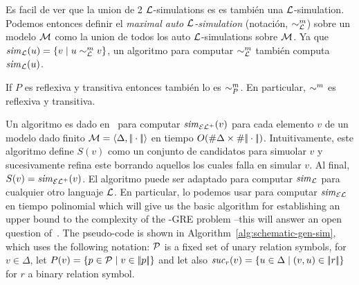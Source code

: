 \iffullversion
Es facil de ver que la union de 2 $\mathcal{L}$-simulations es
es tambi\'en una $\mathcal{L}$-simulation. Podemos entonces definir el \emph{maximal
auto $\mathcal{L}$-simulation} (notaci\'on, $\sim^m_{\mathcal{L}}$) sobre un modelo $\mathcal{M}$ como la union de todos los
auto $\mathcal{L}$-simulations sobre $\mathcal{M}$. Ya que
${\it sim}_{\mathcal{L}}(u) = \{v \mid u \sim^m_{\mathcal{L}} v\}$, un algoritmo
para computar $\sim^m_{\mathcal{L}}$ tambi\'en computa ${\it sim}_{\mathcal{L}}(u)$.
\else
\fi

\iffullversion
If $P$ es reflexiva y transitiva entonces tambi\'en lo es $\sim^m_P$. En
particular, $\sim^m$ es reflexiva y transitiva.
\else
\fi



Un algoritmo es dado en~\cite{HHK95} para computar ${\it sim}_{{\mathcal{EL}^+}}(v)$ para cada
elemento $v$ de un modelo dado finito
$\mathcal{M}=\langle \Delta,|\!|\cdot|\!| \rangle$
en tiempo $O(\# \Delta\times\# {|\!|\cdot|\!|})$.
Intuitivamente, este algoritmo
define $S(v)$ como un conjunto de candidatos para simuolar $v$ y
sucesivamente refina este borrando aquellos los cuales falla en simular $v$.
Al final, $S(v)={\it sim}_{\mathcal{EL}^+}(v)$. El algoritmo puede ser adaptado para
computar ${\it sim}_{\mathcal{L}}$ para cualquier otro languaje $\mathcal{L}$. En particular,
lo podemos usar para computar ${\it sim}_\mathcal{EL}$ en tiempo polinomial which will
give us the basic algorithm for establishing an upper bound to the
complexity of the \EL-GRE problem --this will answer an open
question of~\cite{AKS08}. The pseudo-code is shown in
Algorithm~\ref{alg:schematic-gen-sim}, which uses the following
notation: $\mathcal{P}$ is a fixed set of unary relation symbols,  for $v\in
\Delta$, let $P(v)=\{p\in\mathcal{P}\mid v\in|\!|p|\!|\}$ and let also
${\it suc}_{r}(v)=\{u\in\Delta\mid(v,u)\in|\!|r|\!|\}$ for $r$ a binary
relation symbol.